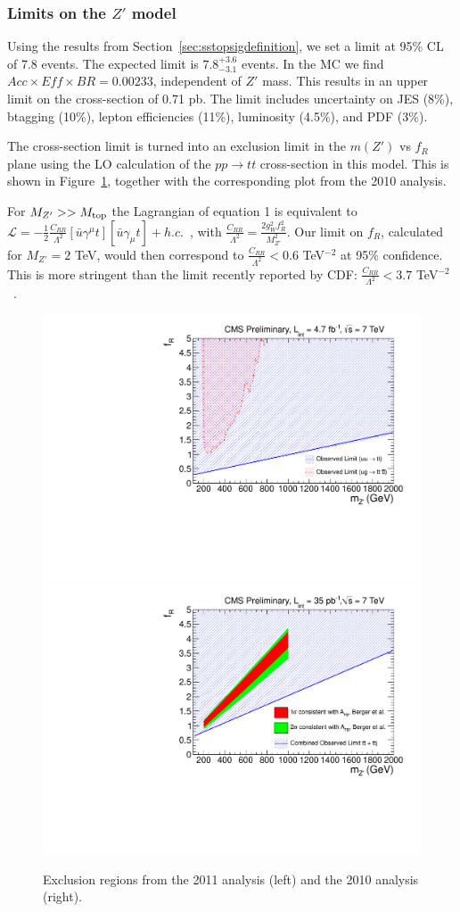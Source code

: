 \subsubsection{Limits on the $Z'$ model}
\label{sec:sstopslimits}
Using the results from Section~\ref{sec:sstopsigdefinition}, we set 
a limit at 95\% CL of 7.8 events.  The expected limit is $7.8^{+3.6}_{-3.1}$ events.
In the MC we find $Acc \times Eff \times BR = 0.00233$, independent of $Z'$ mass. 
This results in an upper limit on the cross-section of 0.71 pb.
The limit includes uncertainty
on JES (8\%), btagging (10\%), lepton efficiencies (11\%), luminosity (4.5\%),
and PDF (3\%).

The cross-section limit is turned into an exclusion limit in the $m(Z')$ vs $f_R$
plane using the LO calculation of the $pp \to tt$ cross-section in this model.
This is shown in Figure~\ref{fig:sstopexclusion}, together with the corresponding
plot from the 2010 analysis.


For $M_{Z'} >> M_{\rm top}$ the Lagrangian of equation 1 is 
equivalent to 
$\mathcal{L} = -\frac{1}{2}\frac{C_{RR}}{\Lambda^2}
 [\bar{u} \gamma^\mu t][\bar{u} \gamma_{\mu} t] + h.c.$~\cite{cdfth2},
with $\frac{C_{RR}}{\Lambda^2} = \frac{2 g_W^2 f_R^2}{M_{Z'}^2}$.
 Our limit on $f_R$, calculated for $M_{Z'}=2$ TeV, 
would then correspond to $\frac{C_{RR}}{\Lambda^2} < 0.6$ TeV$^{-2}$ at 
95\% confidence.  This is more stringent than the limit recently reported
by CDF: $\frac{C_{RR}}{\Lambda^2} < 3.7$ TeV$^{-2}$~\cite{cdflimit}.


\begin{figure}[htb]
\begin{center}
\includegraphics[width=0.45\linewidth]{figs/zprime_exclusion.pdf}
\includegraphics[width=0.45\linewidth]{figs/sscomb.pdf}
\caption{Exclusion regions from the 2011 analysis (left) and the 2010 analysis (right).
\label{fig:sstopexclusion}}
\end{center}
\end{figure}

